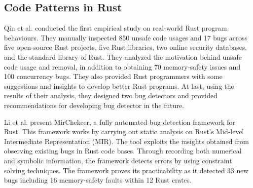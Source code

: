 \subsection{Code Patterns in Rust}

Qin et al. \cite{qin2020understanding} conducted the first empirical study on real-world Rust program behaviours. They manually inspected 850 unsafe code usages and 17 bugs across five open-source Rust projects, five Rust libraries, two online security databases, and the standard library of Rust. They analyzed the motivation behind unsafe code usage and removal, in addition to obtaining 70 memory-safety issues and 100 concurrency bugs. They also provided Rust programmers with some suggestions and insights to develop better Rust programs. At last, using the results of their analysis, they designed two bug detectors and provided recommendations for developing bug detector in the future.

Li et al. \cite{li2021mirchecker} present MirChekcer, a fully automated bug detection framework for Rust. This framework works by carrying out static analysis on Rust's Mid-level Intermediate Representation (MIR). The tool exploits the insights obtained from observing existing bugs in Rust code bases. Through recording both numerical and symbolic information, the framework detects errors by using constraint solving techniques. The framework proves its practicability as it detected 33 new bugs including 16 memory-safety faults within 12 Rust crates.


